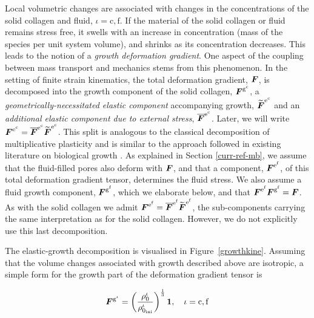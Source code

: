 Local volumetric changes are associated with changes in the
concentrations of the solid collagen and fluid, $\iota =
     \mathrm{c,f}$. If the material of the solid collagen or fluid remains
stress free, it swells with an
increase in concentration (mass of the species per unit system
volume), and shrinks as its concentration decreases. This leads to the
notion of a \emph{growth deformation gradient}. One aspect of the
coupling between mass transport and mechanics stems from this
phenomenon. In the setting of finite strain kinematics, the total
deformation gradient, $\mbox{\boldmath$ F$}$, is decomposed into the growth component
of the solid collagen, $\mbox{\boldmath$ F$}^{\mathrm{g}^\mathrm{c}}$, a
\emph{geometrically-necessitated elastic component} 
accompanying growth, $\widetilde{\mbox{\boldmath$ F$}}^{\mathrm{e}^\mathrm{c}}$ and an \emph{additional elastic component due
to external stress}, $\overline{\mbox{\boldmath$ F$}}^{\mathrm{e}^\mathrm{c}}$. Later,
we will write $\mbox{\boldmath$ F$}^{\mathrm{e}^\mathrm{c}} =
\overline{\mbox{\boldmath$ F$}}^{\mathrm{e}^\mathrm{c}}\widetilde{\mbox{\boldmath$ F$}}^{\mathrm{e}^\mathrm{c}}$.
This split is analogous to the classical
decomposition of multiplicative plasticity \citep{Lee:69} and is
similar to the approach followed in existing literature on biological
growth \citep[see for
  e.g.][]{Klischetal:2001,TaberHumphrey:2001,AmbrosiMollica:2002}. As
explained in Section \ref{curr-ref-mb}, we assume that the
fluid-filled pores also deform with $\mbox{\boldmath$ F$}$, and that a component,
$\mbox{\boldmath$ F$}^{\mathrm{e}^\mathrm{f}}$, of this total deformation gradient
tensor, determines the fluid stress. We also assume a fluid growth
component, $\mbox{\boldmath$ F$}^{\mathrm{g}^\mathrm{f}}$, which we elaborate below,
and that $\mbox{\boldmath$ F$}^{\mathrm{e}^\mathrm{f}}\mbox{\boldmath$ F$}^{\mathrm{g}^\mathrm{f}} =
\mbox{\boldmath$ F$}$. As with the solid collagen we admit $\mbox{\boldmath$ F$}^{\mathrm{e}^\mathrm{f}}
=
\overline{\mbox{\boldmath$ F$}}^{\mathrm{e}^\mathrm{f}}\widetilde{\mbox{\boldmath$ F$}}^{\mathrm{e}^\mathrm{f}}$,
the sub-components carrying the same interpretation as for the solid
collagen. However, we do not explicitly use this last decomposition.

The elastic-growth decomposition is visualised in \mbox{Figure~\ref{growthkine}}.
Assuming that the volume changes associated with growth described
above are isotropic, a simple form for the growth part of the
deformation gradient tensor is

\begin{equation}
\mbox{\boldmath$ F$}^{\mathrm{g}^\iota} = \left(
  \frac{\rho_0^\iota}{\rho_{0_{\mathrm{ini}}}^\iota} \right)^
  {\frac{1}{3}} 
{\bf 1},\quad \iota = \mathrm{c,f}
\label{isotropicgrowth} 
\end{equation} 

